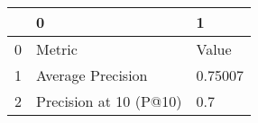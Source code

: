 \begin{tabular}{lll}
\toprule
{} &                       0 &        1 \\
\midrule
0 &                  Metric &    Value \\
1 &       Average Precision &  0.75007 \\
2 &  Precision at 10 (P@10) &      0.7 \\
\bottomrule
\end{tabular}
